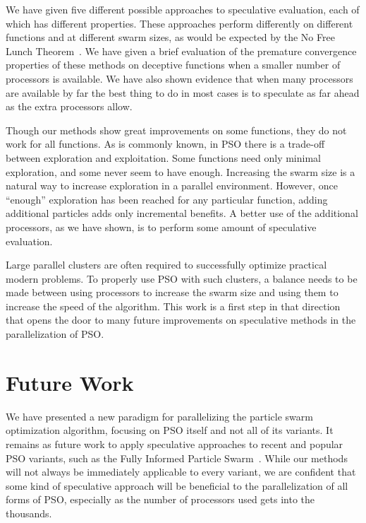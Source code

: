 \documentclass[smallcondensed]{svjour3}
\begin{document}
We have given five different possible approaches to speculative evaluation,
each of which has different properties.  These approaches perform differently
on different functions and at different swarm sizes, as would be expected by
the No Free Lunch Theorem~\citep{wolpert-1997-nfl-for-optimization}.  We have
given a brief evaluation of the premature convergence properties of these
methods on deceptive functions when a smaller number of processors is
available.  We have also shown evidence that when many processors are available
by far the best thing to do in most cases is to speculate as far ahead as the
extra processors allow.

Though our methods show great improvements on some functions, they do not work
for all functions.  As is commonly known, in PSO there is a trade-off between
exploration and exploitation.  Some functions need only minimal exploration,
and some never seem to have enough.  Increasing the swarm size is a natural way
to increase exploration in a parallel environment.  However, once ``enough''
exploration has been reached for any particular function, adding additional
particles adds only incremental benefits.  A better use of the additional
processors, as we have shown, is to perform some amount of speculative
evaluation.

Large parallel clusters are often required to successfully optimize practical
modern problems.  To properly use PSO with such clusters, a balance needs to be
made between using processors to increase the swarm size and using them to
increase the speed of the algorithm.  This work is a first step in that
direction that opens the door to many future improvements on speculative
methods in the parallelization of PSO.

\section{Future Work}
\label{sec:future}

We have presented a new paradigm for parallelizing the particle swarm
optimization algorithm, focusing on PSO itself and not all of its variants.  It
remains as future work to apply speculative approaches to recent and popular
PSO variants, such as the Fully Informed Particle
Swarm~\citep{mendes-2004-fully-informed-particle-swarm}.  While our methods
will not always be immediately applicable to every variant, we are confident
that some kind of speculative approach will be beneficial to the
parallelization of all forms of PSO, especially as the number of processors
used gets into the thousands.
\end{document}
